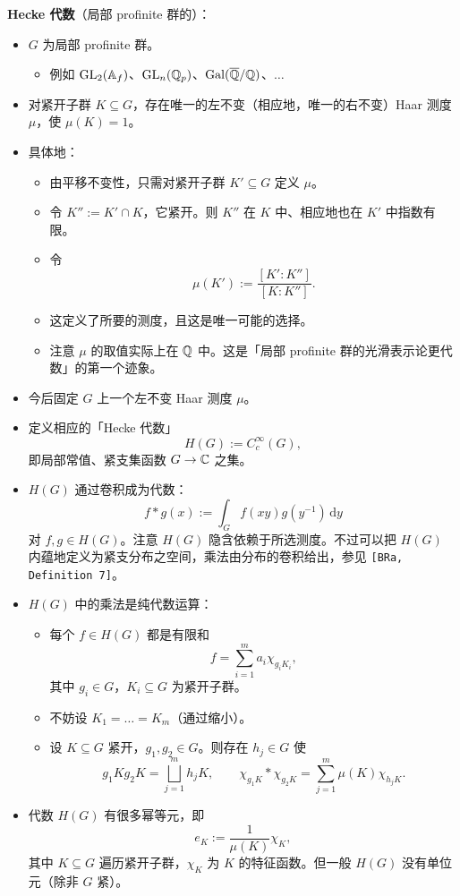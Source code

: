 \textbf{Hecke 代数}（局部 profinite 群的）：
\begin{itemize}
\item $G$ 为局部 profinite 群。
\begin{itemize}
\item 例如 $\operatorname{GL}_2(\mathbb{A}_f)$、$\operatorname{GL}_n(\mathbb{Q}_p)$、$\operatorname{Gal}(\overline{\mathbb{Q}}/\mathbb{Q})$、$\dots$
\end{itemize}
\item 对紧开子群 $K\subseteq G$，存在唯一的左不变（相应地，唯一的右不变）Haar 测度 $\mu$，使 $\mu(K)=1$。
\item 具体地：
\begin{itemize}
\item 由平移不变性，只需对紧开子群 $K'\subseteq G$ 定义 $\mu$。
\item 令 $K'':=K'\cap K$，它紧开。则 $K''$ 在 $K$ 中、相应地也在 $K'$ 中指数有限。
\item 令
\[
\mu(K'):=\frac{[K':K'']}{[K:K'']}.
\]
\item 这定义了所要的测度，且这是唯一可能的选择。
\item 注意 $\mu$ 的取值实际上在 $\mathbb{Q}$ 中。这是「局部 profinite 群的光滑表示论更代数」的第一个迹象。
\end{itemize}
\item 今后固定 $G$ 上一个左不变 Haar 测度 $\mu$。
\item 定义相应的「Hecke 代数」
\[
H(G):=C_c^\infty(G),
\]
即局部常值、紧支集函数 $G\to\mathbb{C}$ 之集。
\item $H(G)$ 通过卷积成为代数：
\[
f*g(x):=\int_G f(xy)g(y^{-1})\,\mathrm{d}y
\]
对 $f,g\in H(G)$。注意 $H(G)$ 隐含依赖于所选测度。不过可以把 $H(G)$ 内蕴地定义为紧支分布之空间，乘法由分布的卷积给出，参见 \texttt{[BRa, Definition 7]}。
\item $H(G)$ 中的乘法是纯代数运算：
\begin{itemize}
\item 每个 $f\in H(G)$ 都是有限和
\[
f=\sum_{i=1}^m a_i\chi_{g_iK_i},
\]
其中 $g_i\in G$，$K_i\subseteq G$ 为紧开子群。
\item 不妨设 $K_1=\dots=K_m$（通过缩小）。
\item 设 $K\subseteq G$ 紧开，$g_1,g_2\in G$。则存在 $h_j\in G$ 使
\[
g_1Kg_2K=\bigsqcup_{j=1}^m h_jK,\qquad
\chi_{g_1K}*\chi_{g_2K}=\sum_{j=1}^m\mu(K)\chi_{h_jK}.
\]
\end{itemize}
\item 代数 $H(G)$ 有很多幂等元，即
\[
e_K:=\frac{1}{\mu(K)}\chi_K,
\]
其中 $K\subseteq G$ 遍历紧开子群，$\chi_K$ 为 $K$ 的特征函数。但一般 $H(G)$ 没有单位元（除非 $G$ 紧）。
\end{itemize}

